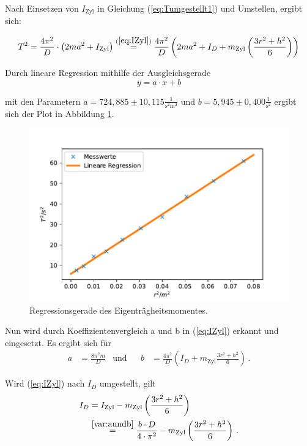 Nach Einsetzen von $I_{\text{Zyl}}$ in Gleichung (\ref{eq:Tumgestellt1}) und Umstellen, ergibt sich:

\begin{equation}
  T^2 = \frac{4 \pi^2}{D} \cdot \left( 2ma^2 + I_{\text{Zyl}} \right) \stackrel{(\ref{eq:IZyl})}{=} 
  \frac{4 \pi^2}{D} \left( 2ma^2 + I_{D} + m_{\text{Zyl}}  \left( \frac{3 r^2 + h^2}{6} \right) \right)
\end{equation}

Durch lineare Regression mithilfe der Ausgleichsgerade 
\begin{equation*}
  y = a \cdot x + b 
\end{equation*}

mit den Parametern $a = 724,885 ± 10,115 \frac{1}{\unit{\square\second\square\meter}}$ und $b = 5,945 ± 0,400\frac{1}{\unit{\square\second}}$ ergibt sich der Plot in Abbildung \ref{fig:Lineareregression}.

\begin{figure}[H]
  \centering
  \includegraphics{pictures/Lineare Regression.pdf}
  \caption{Regressionsgerade des Eigenträgheitsmomentes.}
  \label{fig:Lineareregression}
\end{figure}

Nun wird durch Koeffizientenvergleich a und b in (\ref{eq:IZyl}) erkannt und eingesetzt.
Es ergibt sich für
\begin{align} \label{var:aundb}
  a & = \frac{8 \pi^2 m}{D} &\text{und} & & b & = \frac{4 \pi^2}{D} \left(I_{D} + m_{\text{Zyl}} \frac{3 r^2 + h^2}{6} \right) \, .
\end{align}

Wird (\ref{eq:IZyl}) nach $I_{D}$ umgestellt, gilt
\begin{equation} \label{eq:idgauß}  %
  \begin{split}
  I_{D} {} &= I_{\text{Zyl}} - m_{\text{Zyl}}  \left( \frac{3 r^2 + h^2}{6} \right) \\
    &\stackrel{\ref{var:aundb}}{=} \frac{b \cdot D}{4 \cdot \pi^2} - m_{\text{Zyl}}  \left( \frac{3 r^2 + h^2}{6} \right) \, .
  \end{split}
\end{equation}

